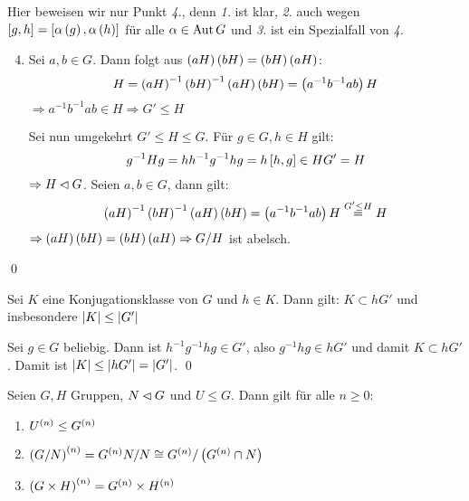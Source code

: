 \begin{beweis}
 Hier beweisen wir nur Punkt \emph{4.}, denn \emph{1.} ist klar, \emph{2.} auch wegen $\left[g,h\right]=\left[\alpha\left(g\right),\alpha\left(h\right)\right]$ f\"ur alle $\alpha \in \operatorname{Aut} G$ und \emph{3.} ist ein Spezialfall von \emph{4.}
 \begin{enumerate}
  \setcounter{enumi}{3}
  \item Sei $a,b \in G$. Dann folgt aus $\left(aH\right)\left(bH\right)=\left(bH\right)\left(aH\right)$:
   \begin{equation*}
    H=\left(aH\right)^{-1}\left(bH\right)^{-1}\left(aH\right)\left(bH\right)=\left(a^{-1}b^{-1}ab\right)H
   \end{equation*}
   $\Rightarrow a^{-1}b^{-1}ab \in H \Rightarrow G' \leq H$

   Sei nun umgekehrt $G' \leq H \leq G$. F\"ur $g \in G, h\in H$ gilt:
   \begin{equation*}
    g^{-1}Hg = hh^{-1}g^{-1}hg = h \left[h,g\right] \in HG' = H
   \end{equation*}
   $\Rightarrow H \lhd G$. Seien $a,b\in G$, dann gilt:
   \begin{equation*}
    \left(aH\right)^{-1}\left(bH\right)^{-1}\left(aH\right)\left(bH\right)=\left(a^{-1}b^{-1}ab\right)H\stackrel{G'\leq H}{=}H
   \end{equation*}
   $\Rightarrow \left(aH\right)\left(bH\right)=\left(bH\right)\left(aH\right) \Rightarrow G/H$ ist abelsch.
 \end{enumerate}
 \qed
\end{beweis}

\begin{bemerkung}
 Sei $K$ eine Konjugationsklasse von $G$ und $h \in K$. Dann gilt: $K \subset hG'$ und insbesondere $\left|K\right|\leq \left|G'\right|$
\end{bemerkung}

\begin{beweis}
 Sei $g \in G$ beliebig. Dann ist $h^{-1}g^{-1}hg \in G'$, also $g^{-1}hg \in hG'$ und damit $K \subset hG'$. Damit ist $\left|K\right| \leq \left|hG'\right|=\left|G'\right|$.
 \qed
\end{beweis}

\begin{satz} \label{2.17}
 Seien $G,H$ Gruppen, $N \lhd G$ und $U \leq G$. Dann gilt f\"ur alle $n \geq 0$:
 \begin{enumerate}
  \item $U^{\left(n\right)} \leq G^{\left(n\right)}$
  \item $\left(G/N\right)^{\left(n\right)} = G^{\left(n\right)}N/N \cong G^{\left(n\right)}/\left(G^{\left(n\right)}\cap N\right)$
  \item $\left(G \times H\right)^{\left(n\right)} = G^{\left(n\right)} \times H^{\left(n\right)}$
 \end{enumerate}
\end{satz}

